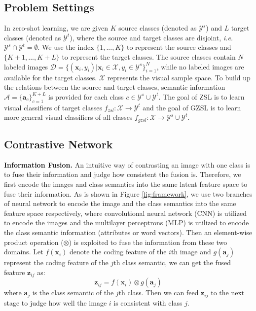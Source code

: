 \documentclass[10pt,twocolumn,letterpaper]{article}
\begin{document}
\subsection{Problem Settings}

In zero-shot learning, we are given $K$ source classes (denoted as $\mathcal{Y}^s$) and $L$ target classes (denoted as $\mathcal{Y}^t$), where the source and target classes are disjoint, \emph{i.e.} $\mathcal{Y}^{s} \cap \mathcal{Y}^{t} = \emptyset $. We use the index $\{1,...,K\}$ to represent the source classes and $\{K+1,...,K+L\}$ to represent the target classes. The source classes contain $N$ labeled images $\mathcal{D} = \{(\bm{x}_i,y_i)| \bm{x}_i \in \mathcal{X}, y_i \in \mathcal{Y}^s \}_{i=1}^{N}$, while no labeled images are available for the target classes. $\mathcal{X}$ represents the visual sample space. To build up the relations between the source and target classes, semantic information $\mathcal{A} = \{ \bm{a}_c\}_{c=1}^{K+L}$ is provided for each class $c \in \mathcal{Y}^{s} \cup \mathcal{Y}^{t}$. The goal of ZSL is to learn visual classifiers of target classes $f_{zsl} : \mathcal{X} \rightarrow \mathcal{Y}^{t}$ and the goal of GZSL is to learn more general visual classifiers of all classes $f_{gzsl} : \mathcal{X} \rightarrow \mathcal{Y}^{s} \cup \mathcal{Y}^{t}$.

\subsection{Contrastive Network}

\textbf{Information Fusion.} An intuitive way of contrasting an image with one class is to fuse their information and judge how consistent the fusion is. Therefore, we first encode the images and class semantics into the same latent feature space to fuse their information. As is shown in Figure \ref{fig:framework}, we use two branches of neural network to encode the image and the class semantics into the same feature space respectively, where convolutional neural network (CNN) is utilized to encode the images and the multilayer perceptrons (MLP) is utilized to encode the class semantic information (attributes or word vectors). Then an element-wise product operation ($ \otimes$) is exploited to fuse the information from these two domains. Let $f(\bm{x}_i)$ denote the coding feature of the $i$th image and $g(\bm{a}_j)$ represent the coding feature of the $j$th class semantic, we can get the fused feature $\bm{z}_{ij}$ as:
\begin{equation}
  \bm{z}_{ij} = f(\bm{x}_i) \otimes g(\bm{a}_j)
  \label{equ:fusion}
\end{equation}
where $\bm{a}_j$ is the class semantic of the $j$th class. Then we can feed $\bm{z}_{ij}$ to the next stage to judge how well the image $i$ is consistent with class $j$.
\end{document}
